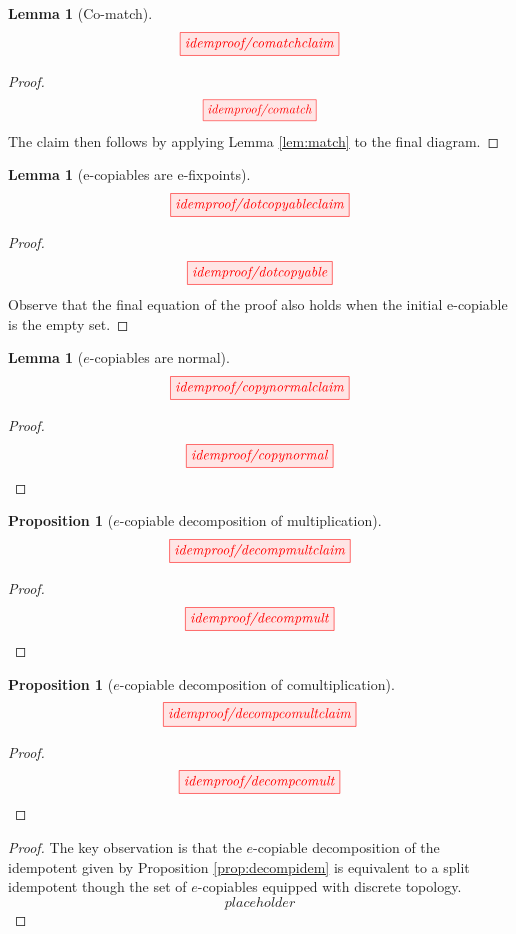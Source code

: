 \documentclass{tufte-handout}
\theoremstyle{definition}
\newtheorem{lemma}[theorem]{Lemma}
\newtheorem{proposition}[theorem]{Proposition}
\begin{document}
\begin{fullwidth}
\begin{lemma}[Co-match]\label{lem:comatch}
\[\scalebox{1}{\tikzfig{idemproof/comatchclaim}}\]
\begin{proof}
\[\scalebox{0.9}{\tikzfig{idemproof/comatch}}\]
The claim then follows by applying Lemma \ref{lem:match} to the final diagram.
\end{proof}
\end{lemma}

\begin{lemma}[e-copiables are e-fixpoints]\label{lem:ecopyfixpoint}
\[\scalebox{1}{\tikzfig{idemproof/dotcopyableclaim}}\]
\begin{proof}
\[\scalebox{1}{\tikzfig{idemproof/dotcopyable}}\]
Observe that the final equation of the proof also holds when the initial e-copiable is the empty set.
\end{proof}
\end{lemma}

\begin{lemma}[$e$-copiables are normal]\label{lem:ecopynormal}
\[\scalebox{1}{\tikzfig{idemproof/copynormalclaim}}\]
\begin{proof}
\[\scalebox{1}{\tikzfig{idemproof/copynormal}}\]
\end{proof}
\end{lemma}
{}
\begin{proposition}[$e$-copiable decomposition of multiplication]\label{prop:decompmult}
\[\scalebox{1}{\tikzfig{idemproof/decompmultclaim}}\]
\begin{proof}
\[\scalebox{1}{\tikzfig{idemproof/decompmult}}\]
\end{proof}
\end{proposition}

\begin{proposition}[$e$-copiable decomposition of comultiplication]\label{prop:decompcomult}
\[\scalebox{1}{\tikzfig{idemproof/decompcomultclaim}}\]
\begin{proof}
\[\scalebox{1}{\tikzfig{idemproof/decompcomult}}\]
\end{proof}
\end{proposition}

\begin{proof}
The key observation is that the $e$-copiable decomposition of the idempotent given by Proposition \ref{prop:decompidem} is equivalent to a split idempotent though the set of $e$-copiables equipped with discrete topology.
\[placeholder\]

\end{proof}

\end{fullwidth}
\end{document}
